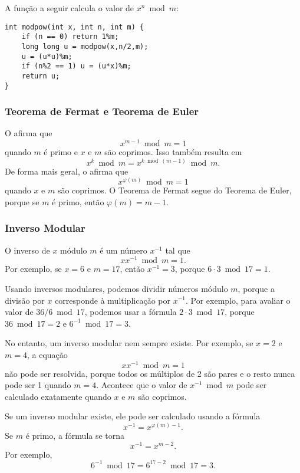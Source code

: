 A função a seguir calcula o valor de $x^n \bmod m$:

\begin{lstlisting}
int modpow(int x, int n, int m) {
    if (n == 0) return 1%m;
    long long u = modpow(x,n/2,m);
    u = (u*u)%m;
    if (n%2 == 1) u = (u*x)%m;
    return u;
}
\end{lstlisting}

\subsubsection{Teorema de Fermat e Teorema de Euler}


O 
afirma que
\[x^{m-1} \bmod m = 1\]
quando $m$ é primo e $x$ e $m$ são coprimos. Isso também resulta em
\[x^k \bmod m = x^{k \bmod (m-1)} \bmod m.\]
De forma mais geral, o 
afirma que
\[x^{\varphi(m)} \bmod m = 1\]
quando $x$ e $m$ são coprimos. O Teorema de Fermat segue do Teorema de Euler, porque se $m$ é primo, então $\varphi(m)=m-1$.

\subsubsection{Inverso Modular}


O inverso de $x$ módulo $m$ é um número $x^{-1}$ tal que
\[ x x^{-1} \bmod m = 1. \]
Por exemplo, se $x=6$ e $m=17$, então $x^{-1}=3$, porque $6\cdot3 \bmod 17=1$.

Usando inversos modulares, podemos dividir números módulo $m$, porque a divisão por $x$ corresponde à multiplicação por $x^{-1}$. Por exemplo, para avaliar o valor de $36/6 \bmod 17$, podemos usar a fórmula $2 \cdot 3 \bmod 17$, porque $36 \bmod 17 = 2$ e $6^{-1} \bmod 17 = 3$.

No entanto, um inverso modular nem sempre existe. Por exemplo, se $x=2$ e $m=4$, a equação
\[ x x^{-1} \bmod m = 1 \]
não pode ser resolvida, porque todos os múltiplos de 2 são pares e o resto nunca pode ser 1 quando $m=4$. Acontece que o valor de $x^{-1} \bmod m$ pode ser calculado exatamente quando $x$ e $m$ são coprimos.

Se um inverso modular existe, ele pode ser calculado usando a fórmula
\[
x^{-1} = x^{\varphi(m)-1}.
\]
Se $m$ é primo, a fórmula se torna
\[
x^{-1} = x^{m-2}.
\]
Por exemplo,
\[6^{-1} \bmod 17 =6^{17-2} \bmod 17 = 3.\]

